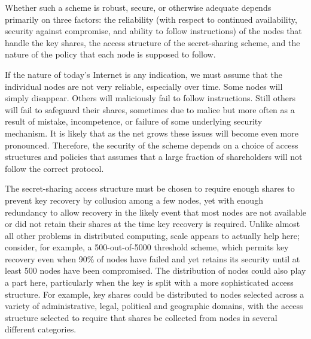 Whether such a scheme is robust, secure, or otherwise adequate depends
primarily on three factors: the reliability (with respect to continued
availability, security against compromise, and ability to follow
instructions) of the nodes that handle the key shares, the access
structure of the secret-sharing scheme, and the nature of the policy
that each node is supposed to follow.

If the nature of today's Internet is any indication, we must assume
that the individual nodes are not very reliable, especially over time.
Some nodes will simply disappear.  Others will maliciously fail to
follow instructions.  Still others will fail to safeguard their
shares, sometimes due to malice but more often as a result of mistake,
incompetence, or failure of some underlying security mechanism.  It is
likely that as the net grows these issues will become even more
pronounced.  Therefore, the security of the scheme depends on a choice
of access structures and policies that assumes that a large fraction
of shareholders will not follow the correct protocol.

The secret-sharing access structure must be chosen to require enough
shares to prevent key recovery by collusion among a few nodes, yet
with enough redundancy to allow recovery in the likely event that most
nodes are not available or did not retain their shares at the time key
recovery is required.  Unlike almost all other problems in distributed
computing, scale appears to actually help here; consider, for example,
a 500-out-of-5000 threshold scheme, which permits key recovery even
when 90\% of nodes have failed and yet retains its security until at
least 500 nodes have been compromised.  The distribution of nodes
could also play a part here, particularly when the key is split with a
more sophisticated access structure.  For example, key shares could be
distributed to nodes selected across a variety of administrative,
legal, political and geographic domains, with the access structure
selected to require that shares be collected from nodes in several
different categories.


